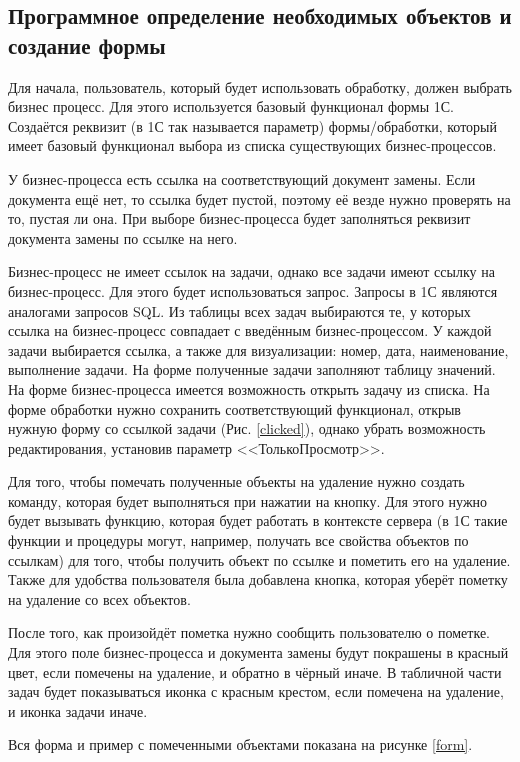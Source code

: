     \subsection{Программное определение необходимых объектов и создание формы}
    Для начала, пользователь, который будет использовать обработку, должен выбрать бизнес процесс. Для этого используется базовый функционал формы 1С. Создаётся реквизит (в 1С так называется параметр) формы/обработки, который имеет базовый функционал выбора из списка существующих бизнес-процессов. 

    У бизнес-процесса есть ссылка на соответствующий документ замены. Если документа ещё нет, то ссылка будет пустой, поэтому её везде нужно проверять на то, пустая ли она. При выборе бизнес-процесса будет заполняться реквизит документа замены по ссылке на него.
    
    Бизнес-процесс не имеет ссылок на задачи, однако все задачи имеют ссылку на бизнес-процесс. Для этого будет использоваться запрос. Запросы в 1С являются аналогами запросов SQL. Из таблицы всех задач выбираются те, у которых ссылка на бизнес-процесс совпадает с введённым бизнес-процессом. У каждой задачи выбирается ссылка, а также для визуализации: номер, дата, наименование, выполнение задачи. На форме полученные задачи заполняют таблицу значений. На форме бизнес-процесса имеется возможность открыть задачу из списка. На форме обработки нужно сохранить соответствующий функционал, открыв нужную форму со ссылкой задачи (Рис. \ref{clicked}), однако убрать возможность редактирования, установив параметр <<ТолькоПросмотр>>.

    Для того, чтобы помечать полученные объекты на удаление нужно создать команду, которая будет выполняться при нажатии на кнопку. Для этого нужно будет вызывать функцию, которая будет работать в контексте сервера (в 1С такие функции и процедуры могут, например, получать все свойства объектов по ссылкам) для того, чтобы получить объект по ссылке и пометить его на удаление. Также для удобства пользователя была добавлена кнопка, которая уберёт пометку на удаление со всех объектов.

    После того, как произойдёт пометка нужно сообщить пользователю о пометке. Для этого поле бизнес-процесса и документа замены будут покрашены в красный цвет, если помечены на удаление, и обратно в чёрный иначе. В табличной части задач будет показываться иконка с красным крестом, если помечена на удаление, и иконка задачи иначе.
    
    Вся форма и пример с помеченными объектами показана на рисунке \ref{form}.

